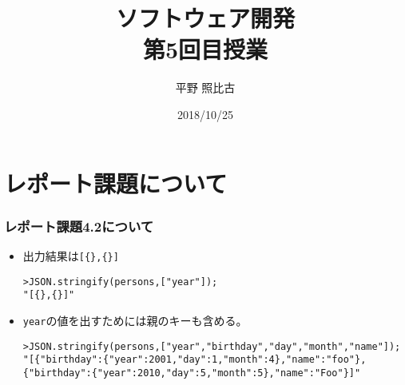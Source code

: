 %

\title{ソフトウェア開発\\第5回目授業}
\author{平野 照比古}
\institute{}
\date{2018/10/25}

\frame{\maketitle}
\section{レポート課題について}
\begin{frame}[containsverbatim]
 \frametitle{レポート課題4.2について}
 \begin{itemize}
  \item      出力結果は\Verb+[{},{}]+
\begin{Verbatim}
>JSON.stringify(persons,["year"]);
"[{},{}]"
 \end{Verbatim}
  \item \texttt{year}の値を出すためには親のキーも含める。
        {\footnotesize
\begin{Verbatim}
>JSON.stringify(persons,["year","birthday","day","month","name"]);
"[{"birthday":{"year":2001,"day":1,"month":4},"name":"foo"},
{"birthday":{"year":2010,"day":5,"month":5},"name":"Foo"}]"
\end{Verbatim}
        }
 \end{itemize}
\end{frame}
